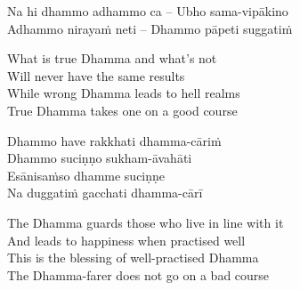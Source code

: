 \suttaRef{[SN 6.2]}

\begin{verses}
  Na hi dhammo adhammo ca – Ubho sama-vipākino\\
  Adhammo nirayaṁ neti – Dhammo pāpeti suggatiṁ
\end{verses}

\begin{english-verses}
    What is true Dhamma and what's\makeatletter\hyperlink{endnote29-appendix}\makeatother
  not\\
  Will never have the same results\\
    While wrong\makeatletter\hyperlink{endnote30-appendix}\makeatother
  Dhamma leads to hell realms\\
  True Dhamma takes one on a good course
\end{english-verses}

\begin{verses}
    Dhammo have rakkhati dhamma-cāriṁ\\
  Dhammo suciṇṇo sukham-āvahāti\\
  Esānisaṁso dhamme suciṇṇe\\
  Na duggatiṁ gacchati dhamma-cārī\makeatletter\hyperlink{endnote31-appendix}\makeatother

\end{verses}

\begin{english-verses}
  The Dhamma guards those who live in line with it\\
  And leads to happiness when practised well\\
  This is the blessing of well-practised Dhamma\\
  The Dhamma-farer does not go on a bad course
\end{english-verses}

